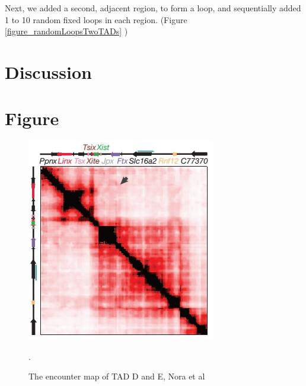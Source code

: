 \documentclass[12pt]{paper}
\begin{document}
Next, we added a second, adjacent region, to form a loop, and sequentially added 1 to 10 random fixed loops in each region. (Figure \ref{figure_randomLoopsTwoTADs} )





\section{Discussion}\label{section_discussion}

\section{Figure}\label{section_figures}

\begin{figure}[H]
\includegraphics[scale=0.8]{TadDandENoraEtAl2012}
\caption{The encounter map of TAD D and E, Nora et al \cite{Nora2012}}.
\label{figure_TADDAndENoraEtAl2012}
\end{figure}
\end{document}
